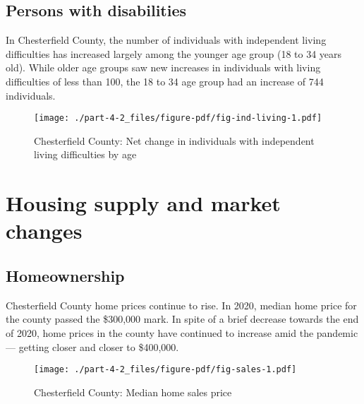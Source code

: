 \documentclass[
  letterpaper,
  DIV=11,
  numbers=noendperiod]{scrreprt}
\begin{document}
\hypertarget{persons-with-disabilities-1}{%
\subsection{Persons with
disabilities}\label{persons-with-disabilities-1}}

In Chesterfield County, the number of individuals with independent
living difficulties has increased largely among the younger age group
(18 to 34 years old). While older age groups saw new increases in
individuals with living difficulties of less than 100, the 18 to 34 age
group had an increase of 744 individuals.

\begin{figure}

{\centering \texttt{[image: ./part-4-2\_files/figure-pdf/fig-ind-living-1.pdf]}

}

\caption{\label{fig-ind-living}Chesterfield County: Net change in
individuals with independent living difficulties by age}

\end{figure}

\hypertarget{housing-supply-and-market-changes-1}{%
\section{Housing supply and market
changes}\label{housing-supply-and-market-changes-1}}

\hypertarget{homeownership-1}{%
\subsection{Homeownership}\label{homeownership-1}}

Chesterfield County home prices continue to rise. In 2020, median home
price for the county passed the \$300,000 mark. In spite of a brief
decrease towards the end of 2020, home prices in the county have
continued to increase amid the pandemic --- getting closer and closer to
\$400,000.

\begin{figure}

{\centering \texttt{[image: ./part-4-2\_files/figure-pdf/fig-sales-1.pdf]}

}

\caption{\label{fig-sales}Chesterfield County: Median home sales price}

\end{figure}
\end{document}

